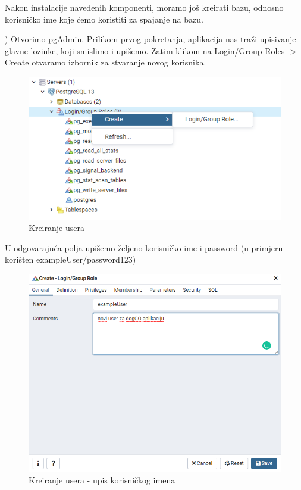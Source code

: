                 \noindent Nakon instalacije navedenih komponenti, moramo još kreirati bazu, odnosno korisničko ime koje ćemo koristiti za spajanje na bazu.\newline
                
                ) Otvorimo pgAdmin. Prilikom prvog pokretanja, aplikacija nas traži upisivanje glavne lozinke, koji smislimo i upišemo. Zatim klikom na Login/Group Roles -> Create otvaramo izbornik za stvaranje novog korisnika.
                
                    \begin{figure}[H]
        				\includegraphics[scale=0.6]{slike/deploy_kreiranje_usera1.PNG} 
        				\centering
        				\caption{Kreiranje usera}
        				\label{fig:sustav-prvi-slucaj}
        			\end{figure}
        			
        		U odgovarajuća polja upišemo željeno korisničko ime i password (u primjeru korišten exampleUser/password123)
                
                    \begin{figure}[H]
        				\includegraphics[scale=0.6]{slike/deploy_kreiranje_usera2.PNG} 
        				\centering
        				\caption{Kreiranje usera - upis korisničkog imena}
        				\label{fig:sustav-prvi-slucaj}
        			\end{figure}
        			
